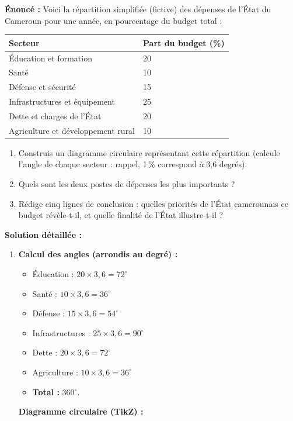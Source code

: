 \documentclass[11pt]{article}
\begin{document}
\begin{exoresolu}
\textbf{Énoncé :} Voici la répartition simplifiée (fictive) des dépenses de l'État du Cameroun pour une année, en pourcentage du budget total :

\begin{center}
\begin{tabularx}{\linewidth}{|l|X|}\hline
\rowcolor{popblueL} \textbf{Secteur} & \textbf{Part du budget (\%)} \\ \hline
Éducation et formation & 20 \\ \hline
Santé & 10 \\ \hline
Défense et sécurité & 15 \\ \hline
Infrastructures et équipement & 25 \\ \hline
Dette et charges de l'État & 20 \\ \hline
Agriculture et développement rural & 10 \\ \hline
\end{tabularx}
\end{center}

\begin{enumerate}
\item Construis un diagramme circulaire représentant cette répartition (calcule l'angle de chaque secteur : rappel, 1\,\% correspond à 3,6 degrés).
\item Quels sont les deux postes de dépenses les plus importants ?
\item Rédige cinq lignes de conclusion : quelles priorités de l'État camerounais ce budget révèle-t-il, et quelle finalité de l'État illustre-t-il ?
\end{enumerate}
\tcblower
\textbf{Solution détaillée :}
\begin{enumerate}
\item \textbf{Calcul des angles (arrondis au degré) :}
\begin{itemize}
\item Éducation : $20 \times 3,6 = 72^\circ$
\item Santé : $10 \times 3,6 = 36^\circ$
\item Défense : $15 \times 3,6 = 54^\circ$
\item Infrastructures : $25 \times 3,6 = 90^\circ$
\item Dette : $20 \times 3,6 = 72^\circ$
\item Agriculture : $10 \times 3,6 = 36^\circ$
\item \textbf{Total : } $360^\circ$.
\end{itemize}
\textbf{Diagramme circulaire (TikZ) :}
\begin{popfigure}
\end{popfigure}
\end{enumerate}
\end{exoresolu}
\end{document}
